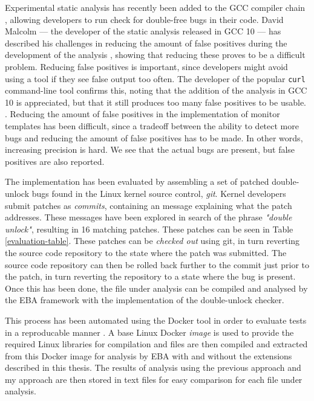 Experimental static analysis has recently been added to the GCC compiler chain \cite{gcc10}, allowing developers to run check for double-free bugs in their code. David Malcolm --- the developer of the static analysis released in GCC 10 --- has described his challenges in reducing the amount of false positives during the development of the analysis \cite{gcc10-development}, showing that reducing these proves to be a difficult problem. Reducing false positives is important, since developers might avoid using a tool if they see false output too often. The developer of the popular \texttt{curl} command-line tool confirms this, noting that the addition of the analysis in GCC 10 is appreciated, but that it still produces too many false positives to be usable. \cite{curl-static-analysis}. Reducing the amount of false positives in the implementation of monitor templates has been difficult, since a tradeoff between the ability to detect more bugs and reducing the amount of false positives has to be made. In other words, increasing precision is hard. We see that the actual bugs are present, but false positives are also reported. 

\newpar The implementation has been evaluated by assembling a set of patched double-unlock bugs found in the Linux kernel source control, \textit{git}. Kernel developers submit patches as \textit{commits}, containing an message explaining what the patch addresses. These messages have been explored in search of the phrase \textit{"double unlock"}, resulting in 16 matching patches. These patches can be seen in Table \ref{evaluation-table}. These patches can be \textit{checked out} using git, in turn reverting the source code repository to the state where the patch was submitted. The source code repository can then be rolled back further to the commit just prior to the patch, in turn reverting the repository to a state where the bug is present. Once this has been done, the file under analysis can be compiled and analysed by the EBA framework with the implementation of the double-unlock checker. 

\newpar This process has been automated using the Docker tool in order to evaluate tests in a reproducable manner \cite{docker}. A base Linux Docker \textit{image} is used to provide the required Linux libraries for compilation and files are then compiled and extracted from this Docker image for analysis by EBA with and without the extensions described in this thesis. The results of analysis using the previous approach and my approach are then stored in text files for easy comparison for each file under analysis. 

